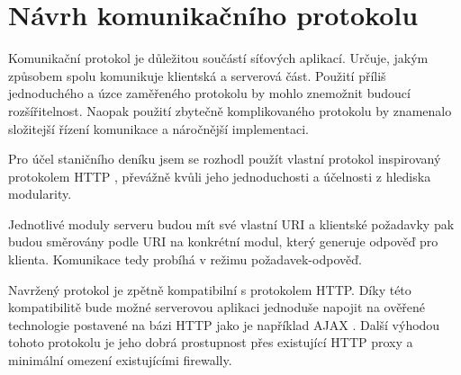 \newpage
\section{Návrh komunikačního protokolu}
\label{navrh_protokol}


Komunikační protokol je důležitou součástí síťových aplikací. Určuje, jakým
způsobem spolu komunikuje
klientská a serverová část. Použití příliš jednoduchého a úzce zaměřeného
protokolu by mohlo znemožnit budoucí rozšířitelnost. Naopak použití zbytečně
komplikovaného protokolu by znamenalo složitejší řízení komunikace a náročnější
implementaci.

Pro účel staničního deníku jsem se rozhodl použít vlastní protokol inspirovaný protokolem HTTP \cite{http},
převážně kvůli jeho jednoduchosti a účelnosti z hlediska modularity.

Jednotlivé moduly serveru budou mít své vlastní URI a klientské požadavky pak budou směrovány podle URI na konkrétní modul,
který generuje odpověď pro klienta. Komunikace tedy probíhá v režimu požadavek-odpověď.

Navržený protokol je zpětně kompatibilní s protokolem HTTP. Díky této kompatibilitě
bude možné serverovou aplikaci jednoduše napojit na ověřené technologie postavené na bázi HTTP jako je například
AJAX \cite{ajax}. Další výhodou tohoto protokolu je jeho dobrá prostupnost přes
existující HTTP proxy a minimální omezení existujícími firewally.


